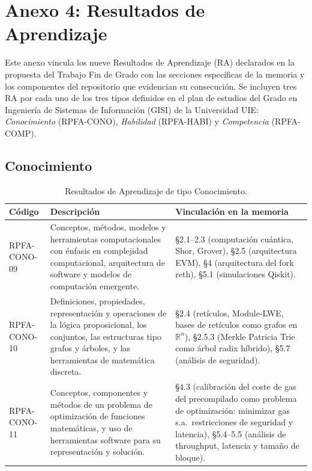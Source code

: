 \section{Anexo 4: Resultados de Aprendizaje}
\label{sec:anexo_ra}

Este anexo vincula los nueve Resultados de Aprendizaje (RA) declarados en la propuesta del Trabajo Fin de Grado con las secciones específicas de la memoria y los componentes del repositorio que evidencian su consecución. Se incluyen tres RA por cada uno de los tres tipos definidos en el plan de estudios del Grado en Ingeniería de Sistemas de Información (GISI) de la Universidad UIE: \emph{Conocimiento} (RPFA-CONO), \emph{Habilidad} (RPFA-HABI) y \emph{Competencia} (RPFA-COMP).

\subsection*{Conocimiento}

\begin{table}[htbp]
\centering
\caption{Resultados de Aprendizaje de tipo Conocimiento.}
\label{tab:ra_cono}
\renewcommand{\arraystretch}{1.35}
\begin{tabular}{@{}>{\raggedright\arraybackslash}p{2.6cm}>{\raggedright\arraybackslash}p{5.8cm}>{\raggedright\arraybackslash}p{6.2cm}@{}}
\toprule
\textbf{Código} & \textbf{Descripción} & \textbf{Vinculación en la memoria} \\
\midrule
RPFA-CONO-09 & Conceptos, métodos, modelos y herramientas computacionales con énfasis en complejidad computacional, arquitectura de software y modelos de computación emergente. & §2.1--2.3 (computación cuántica, Shor, Grover), §2.5 (arquitectura EVM), §4 (arquitectura del fork reth), §5.1 (simulaciones Qiskit). \\
\addlinespace
RPFA-CONO-10 & Definiciones, propiedades, representación y operaciones de la lógica proposicional, los conjuntos, las estructuras tipo grafos y árboles, y las herramientas de matemática discreta. & §2.4 (retículos, Module-LWE, bases de retículos como grafos en $\mathbb{R}^n$), §2.5.3 (Merkle Patricia Trie como árbol radix híbrido), §5.7 (análisis de seguridad). \\
\addlinespace
RPFA-CONO-11 & Conceptos, componentes y métodos de un problema de optimización de funciones matemáticas, y uso de herramientas software para su representación y solución. & §4.3 (calibración del coste de gas del precompilado como problema de optimización: minimizar gas s.a.\ restricciones de seguridad y latencia), §5.4--5.5 (análisis de throughput, latencia y tamaño de bloque). \\
\bottomrule
\end{tabular}
\end{table}


